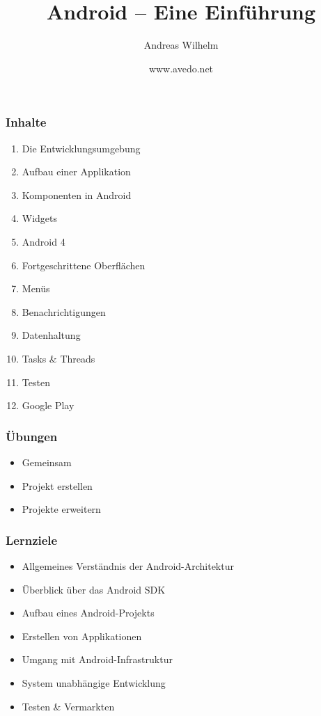 \title{Android -- Eine Einführung}
\author[A. Wilhelm]{Andreas Wilhelm}
\titlegraphic{}
\date{www.avedo.net}

\begin{frame}[plain]
  \titlepage
\end{frame}

\begin{frame}
   \frametitle{Inhalte}
   \begin{enumerate}
		\item Die Entwicklungsumgebung
		\item Aufbau einer Applikation
		\item Komponenten in Android
		\item Widgets
		\item Android 4
		\item Fortgeschrittene Oberflächen
		\item Menüs
		\item Benachrichtigungen
		\item Datenhaltung
		\item Tasks \& Threads
		\item Testen
		\item Google Play
   \end{enumerate}
\end{frame}

\begin{frame}
   \frametitle{Übungen}
   \begin{itemize}
		\item Gemeinsam
		\item Projekt erstellen
		\item Projekte erweitern
   \end{itemize}
\end{frame}

\begin{frame}
   \frametitle{Lernziele}
   \begin{itemize}
		\item Allgemeines Verständnis der Android-Architektur
		\item Überblick über das Android SDK
		\item Aufbau eines Android-Projekts
		\item Erstellen von Applikationen
		\item Umgang mit Android-Infrastruktur
		\item System unabhängige Entwicklung
		\item Testen \& Vermarkten
   \end{itemize}
\end{frame}
